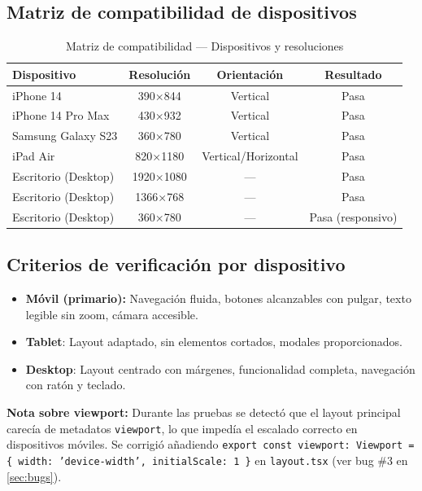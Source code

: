 \subsection{Matriz de compatibilidad de dispositivos}

\begin{table}[H]
    \centering
    \caption{Matriz de compatibilidad — Dispositivos y resoluciones}
    \label{tab:compat_dispositivos}
    \begin{tabular}{|l|c|c|c|}
        \hline
        \textbf{Dispositivo} & \textbf{Resolución} & \textbf{Orientación} & \textbf{Resultado} \\
        \hline
        iPhone 14 & 390×844 & Vertical & Pasa \\
        \hline
        iPhone 14 Pro Max & 430×932 & Vertical & Pasa \\
        \hline
        Samsung Galaxy S23 & 360×780 & Vertical & Pasa \\
        \hline
        iPad Air & 820×1180 & Vertical/Horizontal & Pasa \\
        \hline
        Escritorio (Desktop) & 1920×1080 & — & Pasa \\
        \hline
        Escritorio (Desktop) & 1366×768 & — & Pasa \\
        \hline
        Escritorio (Desktop) & 360×780 & — & Pasa (responsivo) \\
        \hline
    \end{tabular}
\end{table}

\subsection{Criterios de verificación por dispositivo}

\begin{itemize}
    \item \textbf{Móvil (primario):} Navegación fluida, botones alcanzables con pulgar, texto legible sin zoom, cámara accesible.
    \item \textbf{Tablet}: Layout adaptado, sin elementos cortados, modales proporcionados.
    \item \textbf{Desktop}: Layout centrado con márgenes, funcionalidad completa, navegación con ratón y teclado.
\end{itemize}

\textbf{Nota sobre viewport:} Durante las pruebas se detectó que el layout principal carecía de metadatos \texttt{viewport}, lo que impedía el escalado correcto en dispositivos móviles. Se corrigió añadiendo \texttt{export const viewport: Viewport = \{ width: 'device-width', initialScale: 1 \}} en \texttt{layout.tsx} (ver bug \#3 en \ref{sec:bugs}).

